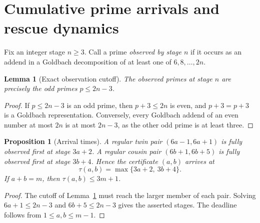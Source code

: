 \documentclass[11pt,a4paper]{article}
\numberwithin{equation}{section}
\newtheorem{proposition}[conjecture]{Proposition}
\newtheorem{lemma}[conjecture]{Lemma}
\theoremstyle{definition}
\begin{document}
\section{Cumulative prime arrivals and rescue dynamics}
Fix an integer stage \(n\ge3\). Call a prime \emph{observed by stage \(n\)} if it occurs as an addend in a Goldbach decomposition of at least one of \(6,8,\ldots,2n\).
\begin{lemma}[Exact observation cutoff]\label{lem:cutoff}
The observed primes at stage \(n\) are precisely the odd primes \(p\le2n-3\).
\end{lemma}
\begin{proof}
If \(p\le2n-3\) is an odd prime, then \(p+3\le2n\) is even, and \(p+3=p+3\) is a Goldbach representation. Conversely, every Goldbach addend of an even number at most \(2n\) is at most \(2n-3\), as the other odd prime is at least three.
\end{proof}
\begin{proposition}[Arrival times]\label{prop:arrival}
A regular twin pair \((6a-1,6a+1)\) is fully observed first at stage \(3a+2\). A regular cousin pair \((6b+1,6b+5)\) is fully observed first at stage \(3b+4\). Hence the certificate \((a,b)\) arrives at
\begin{equation}\label{eq:tau}
\tau(a,b)=\max\{3a+2,\ 3b+4\}.
\end{equation}
If \(a+b=m\), then \(\tau(a,b)\le3m+1\).
\end{proposition}
\begin{proof}
The cutoff of Lemma~\ref{lem:cutoff} must reach the larger member of each pair. Solving \(6a+1\le2n-3\) and \(6b+5\le2n-3\) gives the asserted stages. The deadline follows from \(1\le a,b\le m-1\).
\end{proof}
\end{document}
